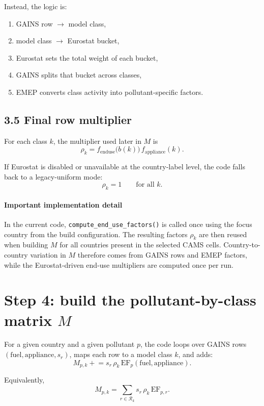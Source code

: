 \documentclass[11pt,a4paper]{article}
\begin{document}
Instead, the logic is:

\begin{enumerate}[leftmargin=1.4em]
  \item GAINS row $\rightarrow$ model class,
  \item model class $\rightarrow$ Eurostat bucket,
  \item Eurostat sets the total weight of each bucket,
  \item GAINS splits that bucket across classes,
  \item EMEP converts class activity into pollutant-specific factors.
\end{enumerate}

\subsection{3.5 Final row multiplier}

For each class $k$, the multiplier used later in $M$ is
\[
\rho_k = f_{\mathrm{enduse}}\bigl(b(k)\bigr)\, f_{\mathrm{appliance}}(k).
\]

If Eurostat is disabled or unavailable at the country-label level, the code falls
back to a legacy-uniform mode:
\[
\rho_k = 1 \qquad \text{for all } k.
\]

\paragraph{Important implementation detail}
In the current code, \texttt{compute\_end\_use\_factors()} is called once using the
focus country from the build configuration. The resulting factors $\rho_k$ are then
reused when building $M$ for all countries present in the selected CAMS cells.
Country-to-country variation in $M$ therefore comes from GAINS rows and EMEP factors,
while the Eurostat-driven end-use multipliers are computed once per run.

\section{Step 4: build the pollutant-by-class matrix $M$}

For a given country and a given pollutant $p$, the code loops over GAINS rows
$(\text{fuel}, \text{appliance}, s_r)$, maps each row to a model class $k$, and adds:
\[
M_{p,k}
\mathrel{+}= s_r \, \rho_k \, \mathrm{EF}_p(\text{fuel}, \text{appliance}).
\]

Equivalently,
\[
M_{p,k} =
\sum_{r \in \mathcal{R}_k}
s_r \, \rho_k \, \mathrm{EF}_{p,r}.
\]
\end{document}
